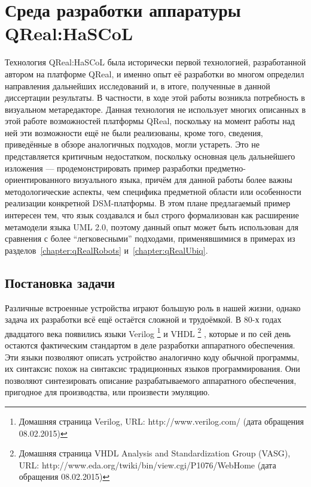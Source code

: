 \section{Среда разработки аппаратуры QReal:HaSCoL}
Технология QReal:HaSCoL была исторически первой технологией, разработанной автором 
на платформе QReal, и именно опыт её разработки во многом определил направления дальнейших 
исследований и, в итоге, полученные в данной диссертации результаты. В частности, 
в ходе этой работы возникла потребность в визуальном метаредакторе. Данная технология 
не использует многих описанных в этой работе возможностей платформы QReal, поскольку 
на момент работы над ней эти возможности ещё не были реализованы, кроме того, сведения, 
приведённые в обзоре аналогичных подходов, могли устареть. Это не представляется критичным 
недостатком, поскольку основная цель дальнейшего изложения --- продемонстрировать 
пример разработки предметно-ориентированного визуального языка, причём для данной 
работы более важны методологические аспекты, чем специфика предметной области или особенности реализации конкретной DSM-платформы. 
В этом плане предлагаемый пример интересен тем, что язык создавался и был строго формализован как расширение метамодели 
языка UML 2.0, поэтому данный опыт может быть использован для сравнения с более "`легковесными"' 
подходами, применявшимися в примерах из разделов~\ref{chapter:qRealRobots} и~\ref{chapter:qRealUbiq}.

\subsection{Постановка задачи}
Различные встроенные устройства играют большую роль в нашей жизни, однако задача их 
разработки всё ещё остаётся сложной и трудоёмкой. В 80-х годах двадцатого века появились языки Verilog%
\footnote{Домашняя страница Verilog, URL: http://www.verilog.com/ (дата обращения 08.02.2015)} и VHDL%
\footnote{Домашняя страница VHDL Analysis and Standardization Group (VASG), URL: http://www.eda.org/twiki/bin/view.cgi/P1076/WebHome (дата обращения 08.02.2015)}
, которые и по сей день остаются фактическим стандартом в деле разработки аппаратного 
обеспечения. Эти языки позволяют описать устройство аналогично коду обычной программы, 
их синтаксис похож на синтаксис традиционных языков программирования. Они позволяют 
синтезировать описание разрабатываемого аппаратного обеспечения, пригодное для производства, 
или произвести эмуляцию.

